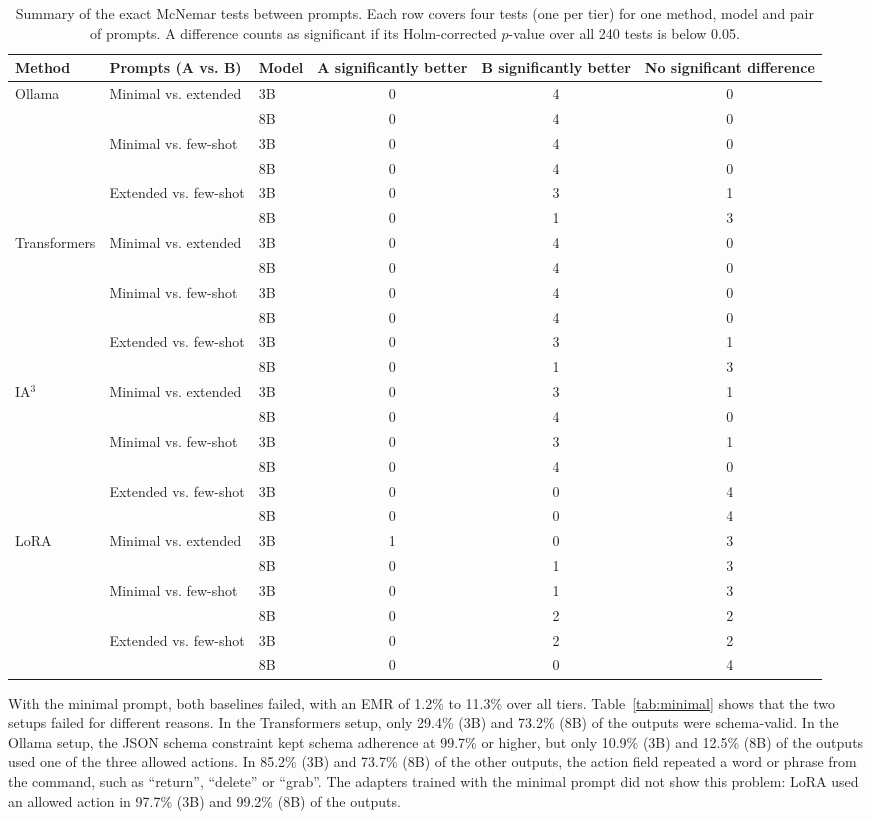 \documentclass[journal,article,submit,pdftex,moreauthors]{Definitions/mdpi}
\begin{document}
\begin{table}[H]
\caption{Summary of the exact McNemar tests between prompts. Each row covers four tests (one per tier) for one method, model and pair of prompts. A difference counts as significant if its Holm-corrected $p$-value over all 240 tests is below 0.05.\label{tab:mcnemar_prompts}}
\begin{tabularx}{\textwidth}{lllCCC}
\toprule
Method & Prompts (A vs. B) & Model & A significantly better & B significantly better & No significant difference \\
\midrule
Ollama & Minimal vs. extended & 3B & 0 & 4 & 0 \\
 &  & 8B & 0 & 4 & 0 \\
 & Minimal vs. few-shot & 3B & 0 & 4 & 0 \\
 &  & 8B & 0 & 4 & 0 \\
 & Extended vs. few-shot & 3B & 0 & 3 & 1 \\
 &  & 8B & 0 & 1 & 3 \\
\midrule
Transformers & Minimal vs. extended & 3B & 0 & 4 & 0 \\
 &  & 8B & 0 & 4 & 0 \\
 & Minimal vs. few-shot & 3B & 0 & 4 & 0 \\
 &  & 8B & 0 & 4 & 0 \\
 & Extended vs. few-shot & 3B & 0 & 3 & 1 \\
 &  & 8B & 0 & 1 & 3 \\
\midrule
IA$^3$ & Minimal vs. extended & 3B & 0 & 3 & 1 \\
 &  & 8B & 0 & 4 & 0 \\
 & Minimal vs. few-shot & 3B & 0 & 3 & 1 \\
 &  & 8B & 0 & 4 & 0 \\
 & Extended vs. few-shot & 3B & 0 & 0 & 4 \\
 &  & 8B & 0 & 0 & 4 \\
\midrule
LoRA & Minimal vs. extended & 3B & 1 & 0 & 3 \\
 &  & 8B & 0 & 1 & 3 \\
 & Minimal vs. few-shot & 3B & 0 & 1 & 3 \\
 &  & 8B & 0 & 2 & 2 \\
 & Extended vs. few-shot & 3B & 0 & 2 & 2 \\
 &  & 8B & 0 & 0 & 4 \\
\bottomrule
\end{tabularx}
\end{table}

With the minimal prompt, both baselines failed, with an EMR of 1.2\% to 11.3\% over all tiers. Table~\ref{tab:minimal} shows that the two setups failed for different reasons. In the Transformers setup, only 29.4\% (3B) and 73.2\% (8B) of the outputs were schema-valid. In the Ollama setup, the JSON schema constraint kept schema adherence at 99.7\% or higher, but only 10.9\% (3B) and 12.5\% (8B) of the outputs used one of the three allowed actions. In 85.2\% (3B) and 73.7\% (8B) of the other outputs, the action field repeated a word or phrase from the command, such as ``return'', ``delete'' or ``grab''. The adapters trained with the minimal prompt did not show this problem: LoRA used an allowed action in 97.7\% (3B) and 99.2\% (8B) of the outputs.
\end{document}
